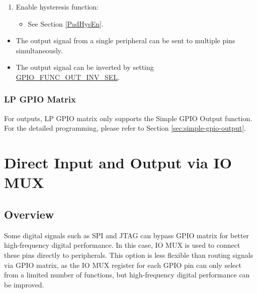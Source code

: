 \documentclass[main\_\_EN.tex]{subfiles}
\begin{document}
\begin{enumerate}
\begin{itemize}
        \item Set the \hyperref[fielddesc:IOMUXGPIONFUNDRV]{IO\_MUX\_GPIO\_FUN\_DRV} field to the desired value for output strength (0$\sim$3). The higher the drive strength, the more current can be sourced/sunk from the pin.
        \item If using open drain mode, set or clear the \hyperref[fielddesc:IOMUXGPIONFUNWPU]{IO\_MUX\_GPIO\_FUN\_WPU} and \hyperref[fielddesc:IOMUXGPIONFUNWPD]{IO\_MUX\_GPIO\_FUN\_WPD} bits to enable or disable the internal pull-up and pull-down resistors.
    \end{itemize}
    \item Enable hysteresis function:
    \begin{itemize}
        \item See Section \ref{PadHysEn}.
    \end{itemize}
\end{enumerate}

\begin{tiplisting}
\vspace{-2em}
\begin{itemize}
\item The output signal from a single peripheral can be sent to multiple pins simultaneously.
\item The output signal can be inverted by setting \hyperref[fielddesc:GPIOFUNCNOUTINVSEL]{GPIO\_FUNC\_OUT\_INV\_SEL}.
\end{itemize}
\end{tiplisting}

\subsubsection{LP GPIO Matrix}

For outputs, LP GPIO matrix only supports the Simple GPIO Output function. For the detailed programming, please refer to Section \ref{sec:simple-gpio-output}.

\section{Direct Input and Output via IO MUX}

\subsection{Overview}

Some digital signals such as SPI and JTAG can bypass GPIO matrix for better high-frequency digital performance. In this case, IO MUX is used to connect these pins directly to peripherals. This option is less flexible than routing signals via GPIO matrix, as the IO MUX register for each GPIO pin can only select from a limited number of functions, but high-frequency digital performance can be improved.
\end{document}
